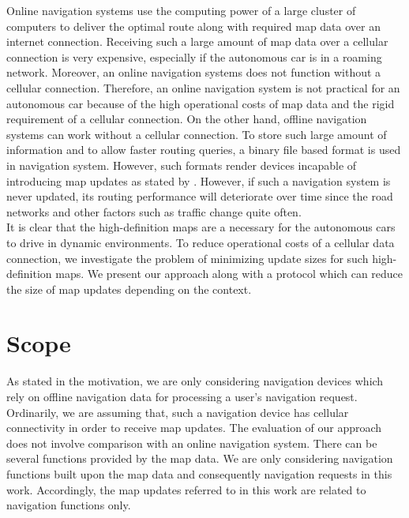 Online navigation systems use the computing power of a large cluster of computers to deliver the optimal route along with required map data over an internet connection. Receiving such a large amount of map data over a cellular connection is very expensive, especially if the autonomous car is in a roaming network. Moreover, an online navigation systems does not function without a cellular connection. Therefore, an online navigation system is not practical for an autonomous car because of the high operational costs of map data and the rigid requirement of a cellular connection. On the other hand, offline navigation systems can work without a cellular connection. To store such large amount of information and to allow faster routing queries, a binary file based format is used in navigation system. However, such formats render devices incapable of introducing map updates as stated by \citet{min2008mobile}. However, if such a navigation system is never updated, its routing performance will deteriorate over time since the road networks and other factors such as traffic change quite often. \\

It is clear that the high-definition maps are a necessary for the autonomous cars to drive in dynamic environments. To reduce operational costs of a cellular data connection, we investigate the problem of minimizing update sizes for such high-definition maps. We present our approach along with a protocol which can reduce the size of map updates depending on the context. \\

\section{Scope} \label{scope}
As stated in the motivation, we are only considering navigation devices which rely on offline navigation data for processing a user's navigation request. Ordinarily, we are assuming that, such a navigation device has cellular connectivity in order to receive map updates. The evaluation of our approach does not involve comparison with an online navigation system. There can be several functions provided by the map data. We are only considering navigation functions built upon the map data and consequently navigation requests in this work. Accordingly, the map updates referred to in this work are related to navigation functions only.

